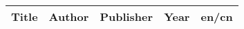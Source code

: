 \documentclass[a4paper,10pt,titlepage]{ctexart}
\title{}
\author{}
\date{\today}
\begin{document}
\begin{center}
\begin{longtable}{%
    | m{}<{\centering}
    | m{}<{\centering}
    | m{}<{\centering}
    | m{}<{\centering}
    | m{}<{\centering}
    |}
\hline
\textbf{Title} & \textbf{Author} & \textbf{Publisher} & \textbf{Year} & \textbf{en/cn} \\
\hline


\end{longtable}
\end{center}
\end{document}
